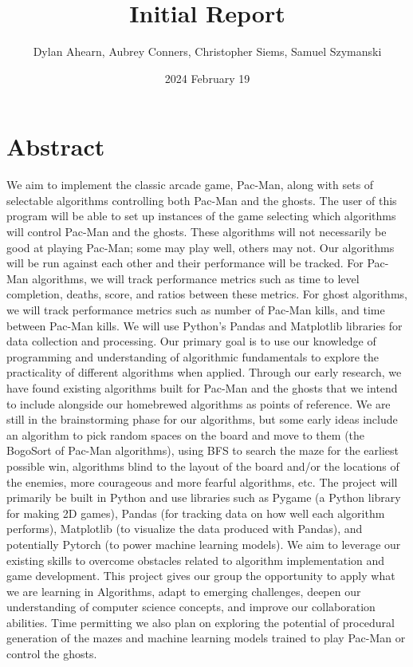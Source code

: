 \documentclass[12pt]{article}
\title{Initial Report}
\author{Dylan Ahearn, Aubrey Conners, Christopher Siems, Samuel Szymanski}
\date{2024 February 19}
\begin{document}
    \parindent=0pt
    \parskip=6pt
    \maketitle
    \onehalfspacing
    \section{Abstract}
        We aim to implement the classic arcade game, Pac-Man, along with sets of selectable algorithms controlling both Pac-Man and the ghosts. The user of this program will be able to set up instances of the game selecting which algorithms will control Pac-Man and the ghosts. These algorithms will not necessarily be good at playing Pac-Man; some may play well, others may not. Our algorithms will be run against each other and their performance will be tracked. For Pac-Man algorithms, we will track performance metrics such as time to level completion, deaths, score, and ratios between these metrics. For ghost algorithms, we will track performance metrics such as number of Pac-Man kills, and time between Pac-Man kills. We will use Python's Pandas and Matplotlib libraries for data collection and processing. Our primary goal is to use our knowledge of programming and understanding of algorithmic fundamentals to explore the practicality of different algorithms when applied. Through our early research, we have found existing algorithms built for Pac-Man and the ghosts that we intend to include alongside our homebrewed algorithms as points of reference. We are still in the brainstorming phase for our algorithms, but some early ideas include an algorithm to pick random spaces on the board and move to them (the BogoSort of Pac-Man algorithms), using BFS to search the maze for the earliest possible win, algorithms blind to the layout of the board and/or the locations of the enemies, more courageous and more fearful algorithms, etc. The project will primarily be built in Python and use libraries such as Pygame (a Python library for making 2D games), Pandas (for tracking data on how well each algorithm performs), Matplotlib (to visualize the data produced with Pandas), and potentially Pytorch (to power machine learning models). We aim to leverage our existing skills to overcome obstacles related to algorithm implementation and game development. This project gives our group the opportunity to apply what we are learning in Algorithms, adapt to emerging challenges, deepen our understanding of computer science concepts, and improve our collaboration abilities. Time permitting we also plan on exploring the potential of procedural generation of the mazes and machine learning models trained to play Pac-Man or control the ghosts.
\end{document}
